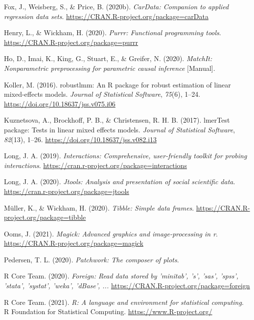 \begin{appendix}
\leavevmode\hypertarget{ref-R-carData}{}%
Fox, J., Weisberg, S., \& Price, B. (2020b). \emph{CarData: Companion to
applied regression data sets}.
\url{https://CRAN.R-project.org/package=carData}

\leavevmode\hypertarget{ref-R-purrr}{}%
Henry, L., \& Wickham, H. (2020). \emph{Purrr: Functional programming
tools}. \url{https://CRAN.R-project.org/package=purrr}

\leavevmode\hypertarget{ref-R-MatchIt}{}%
Ho, D., Imai, K., King, G., Stuart, E., \& Greifer, N. (2020).
\emph{MatchIt: Nonparametric preprocessing for parametric causal
inference} {[}Manual{]}.

\leavevmode\hypertarget{ref-R-robustlmm}{}%
Koller, M. (2016). robustlmm: An R package for robust estimation of
linear mixed-effects models. \emph{Journal of Statistical Software},
\emph{75}(6), 1--24. \url{https://doi.org/10.18637/jss.v075.i06}

\leavevmode\hypertarget{ref-R-lmerTest}{}%
Kuznetsova, A., Brockhoff, P. B., \& Christensen, R. H. B. (2017).
lmerTest package: Tests in linear mixed effects models. \emph{Journal of
Statistical Software}, \emph{82}(13), 1--26.
\url{https://doi.org/10.18637/jss.v082.i13}

\leavevmode\hypertarget{ref-R-interactions}{}%
Long, J. A. (2019). \emph{Interactions: Comprehensive, user-friendly
toolkit for probing interactions}.
\url{https://cran.r-project.org/package=interactions}

\leavevmode\hypertarget{ref-R-jtools}{}%
Long, J. A. (2020). \emph{Jtools: Analysis and presentation of social
scientific data}. \url{https://cran.r-project.org/package=jtools}

\leavevmode\hypertarget{ref-R-tibble}{}%
Müller, K., \& Wickham, H. (2020). \emph{Tibble: Simple data frames}.
\url{https://CRAN.R-project.org/package=tibble}

\leavevmode\hypertarget{ref-R-magick}{}%
Ooms, J. (2021). \emph{Magick: Advanced graphics and image-processing in
r}. \url{https://CRAN.R-project.org/package=magick}

\leavevmode\hypertarget{ref-R-patchwork}{}%
Pedersen, T. L. (2020). \emph{Patchwork: The composer of plots}.

\leavevmode\hypertarget{ref-R-foreign}{}%
R Core Team. (2020). \emph{Foreign: Read data stored by 'minitab', 's',
'sas', 'spss', 'stata', 'systat', 'weka', 'dBase', ...}
\url{https://CRAN.R-project.org/package=foreign}

\leavevmode\hypertarget{ref-R-base}{}%
R Core Team. (2021). \emph{R: A language and environment for statistical
computing}. R Foundation for Statistical Computing.
\url{https://www.R-project.org/}


\end{appendix}
